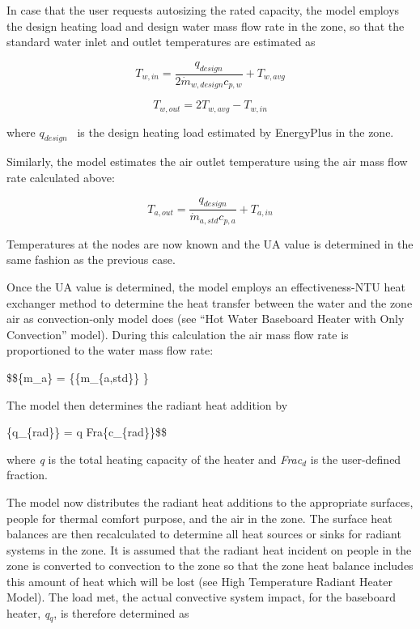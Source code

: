 In case that the user requests autosizing the rated capacity, the model employs the design heating load and design water mass flow rate in the zone, so that the standard water inlet and outlet temperatures are estimated as

\begin{equation}
{T_{w,in}} = \frac{{{q_{design}}}}{{2\dot m{}_{w,design}{c_{p,w}}}} + {T_{w,avg}}
\end{equation}

\begin{equation}
{T_{w,out}} = 2{T_{w,avg}} - {T_{w,in}}
\end{equation}

where \({q_{design}}\) ~is the design heating load estimated by EnergyPlus in the zone.

Similarly, the model estimates the air outlet temperature using the air mass flow rate calculated above:

\begin{equation}
{T_{a,out}} = \frac{{{q_{design}}}}{{\dot m_{a,std} {c_{p,a}}}} + {T_{a,in}}
\end{equation}

Temperatures at the nodes are now known and the UA value is determined in the same fashion as the previous case.

Once the UA value is determined, the model employs an effectiveness-NTU heat exchanger method to determine the heat transfer between the water and the zone air as convection-only model does (see ``Hot Water Baseboard Heater with Only Convection'' model). During this calculation the air mass flow rate is proportioned to the water mass flow rate:

\$\$\{\dot m\_a\} = \{\{\dot m\_\{a,std\}\} \}

The model then determines the radiant heat addition by

\{q\_\{rad\}\} = q \cdot Fra\{c\_\{rad\}\}\$\$

where \emph{q} is the total heating capacity of the heater and \emph{Frac\(_{d}\)} is the user-defined fraction.

The model now distributes the radiant heat additions to the appropriate surfaces, people for thermal comfort purpose, and the air in the zone. The surface heat balances are then recalculated to determine all heat sources or sinks for radiant systems in the zone. It is assumed that the radiant heat incident on people in the zone is converted to convection to the zone so that the zone heat balance includes this amount of heat which will be lost (see High Temperature Radiant Heater Model). The load met, the actual convective system impact, for the baseboard heater, \emph{q\(_{q}\)}, is therefore determined as

